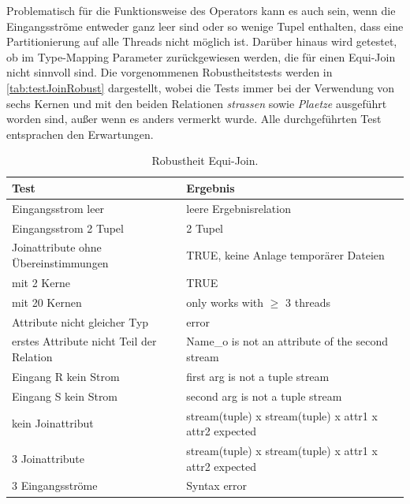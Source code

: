 \documentclass[a4paper,12pt,twoside]{article}
\newcommand{\Fb}[1]{\textit{#1}} %
\begin{document}
Problematisch für die Funktionsweise des Operators kann es auch sein, wenn die Eingangsströme entweder ganz leer sind oder so wenige Tupel enthalten, dass eine Partitionierung auf alle Threads nicht möglich ist. Darüber hinaus wird getestet, ob im Type-Mapping Parameter zurückgewiesen werden, die für einen Equi-Join nicht sinnvoll sind. Die vorgenommenen Robustheitstests werden in \autoref{tab:testJoinRobust} dargestellt, wobei die Tests immer bei der Verwendung von sechs Kernen und mit den beiden Relationen \Fb{strassen} sowie \Fb{Plaetze} ausgeführt worden sind, außer wenn es anders vermerkt wurde. Alle durchgeführten Test entsprachen den Erwartungen.

\begin{table}
	\centering
	\begin{tabular}{|p{7.5cm}|p{7.5cm}|}
		\hline
		\rowcolor{gray!30} 
		Test & Ergebnis \\
		\hline
		Eingangsstrom leer & leere Ergebnisrelation \\ 
		\hline
		Eingangsstrom 2 Tupel & 2 Tupel \\ 
		\hline
		Joinattribute ohne Übereinstimmungen & TRUE, keine Anlage temporärer Dateien \\
		\hline
		mit 2 Kerne & TRUE  \\
		\hline
		mit 20 Kernen & only works with $\geq$ 3 threads  \\ 
		\hline
		Attribute nicht gleicher Typ & error \\ 
		\hline
		erstes Attribute nicht Teil der Relation & Name\_o is not an attribute of the second stream \\ 
		\hline
		Eingang R kein Strom & first arg is not a tuple stream \\ 
		\hline
		Eingang S kein Strom & second arg is not a tuple stream \\ 
		\hline
		kein Joinattribut & stream(tuple) x stream(tuple) x attr1 x attr2 expected \\ 
		\hline
		3 Joinattribute & stream(tuple) x stream(tuple) x attr1 x attr2 expected \\
		\hline
		3 Eingangsströme &  Syntax error \\
		\hline
	\end{tabular}
	\caption{\label{tab:testJoinRobust}Robustheit Equi-Join.}
\end{table}
\end{document}
